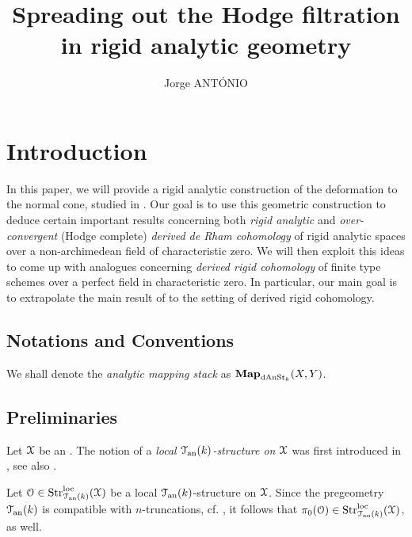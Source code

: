 \documentclass[10pt,a4paper,reqno]{amsart} %
\theoremstyle{plain}
\theoremstyle{definition}
\theoremstyle{remark}
\numberwithin{equation}{section}
\begin{document}
\title{Spreading out the Hodge filtration in rigid analytic geometry}

\author{Jorge ANT\'ONIO}
\address{Jorge ANT\'ONIO, IRMA, UMR 7501
7 rue René-Descartes
67084 Strasbourg Cedex}


\begin{abstract}

\end{abstract}

\maketitle

\tableofcontents

\section{Introduction}

In this paper, we will provide a rigid analytic construction of the deformation to the normal cone, studied in \cite{Gaitsgory_Study_II}.
Our goal is to use this geometric construction to deduce certain important results concerning both \emph{rigid analytic} and
\emph{over-convergent} (Hodge complete)
\emph{derived de Rham cohomology} of rigid analytic spaces over a non-archimedean field of characteristic zero.
We will then exploit this ideas to come up with analogues concerning \emph{derived rigid cohomology} of finite type schemes over a perfect field
in characteristic zero. In particular, our main goal is to extrapolate the main result of \cite{Bhatt_Derived_Completions} to the setting of
derived rigid cohomology.

\subsection{Notations and Conventions} We shall denote the \emph{analytic mapping stack} as $\mathbf{Map}_{\mathrm{dAnSt}_k}(X, Y)$.


\subsection{Preliminaries}
Let $\mathcal X$ be an \inftopos. The notion of a \emph{local $\mathcal T_{\mathrm{an}}(k)$-structure on $\mathcal X$} was first introduced in \cite[Definition 2.4]{Porta_Yu_Derived_non-archimedean_analytic_spaces},
see also \cite[\S 2]{antonio2018p}.

Let  $\mathcal O \in \mathrm{Str}^\mathrm{loc}_{\mathcal T_{\mathrm{an}}(k)}(\mathcal X)$ be a local $\mathcal T_{\mathrm{an}}(k)$-structure on $\mathcal X$. Since the pregeometry $\mathcal T_{\mathrm{an}}(k)$ is compatible
with $n$-truncations, cf. \cite[Theorem 3.23]{Porta_Yu_Derived_non-archimedean_analytic_spaces}, it follows that
$\pi_0(\mathcal O) \in \mathrm{Str}^\mathrm{loc}_{\mathcal T_{\mathrm{an}}(k)}(\mathcal X)$, as well.
\end{document}
